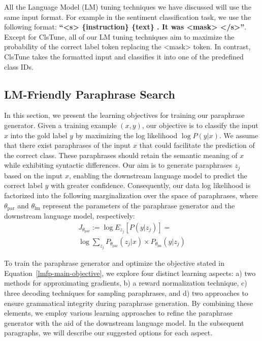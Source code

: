 \documentclass[11pt]{article}
\begin{document}
All the Language Model (LM) tuning techniques we have discussed will use the same input format. For example in the sentiment classification task, we use the following format:
\textbf{``<s> \{instruction\} \{text\} . It was <mask> </s>''}. Except for ClsTune, all of our LM tuning techniques aim to maximize the probability of the correct label token replacing the <mask> token. In contrast, ClsTune takes the formatted input and classifies it into one of the predefined class IDs.
\subsection{LM-Friendly Paraphrase Search}
In this section, we present the learning objectives for training our paraphrase generator. Given a training example $(x, y)$, our objective is to classify the input $x$ into the gold label $y$ by maximizing the log likelihood $\log P(y|x)$. We assume that there exist paraphrases of the input $x$ that could facilitate the prediction of the correct class. These paraphrases should retain the semantic meaning of $x$ while exhibiting syntactic differences. Our aim is to generate paraphrases $z_{j}$ based on the input $x$, enabling the downstream language model to predict the correct label $y$ with greater confidence. Consequently, our data log likelihood is factorized into the following marginalization over the space of paraphrases, where $\theta_{\text{par}}$ and $\theta_{\text{lm}}$ represent the parameters of the paraphrase generator and the downstream language model, respectively:
\begin{multline}
J_{\theta_{\text{par}}} := \log E_{z_{j}} [P(y | z_{j})] = \\ \log \sum_{z_{j}} P_{\theta_{\text{par}}}(z_{j} | x) \times P_{\theta_{\text{lm}}}(y | z_{j})
\label{lmfp-main-objective}
\end{multline}


To train the paraphrase generator and optimize the objective stated in Equation~\ref{lmfp-main-objective}, we explore four distinct learning aspects: a) two methods for approximating gradients, b) a reward normalization technique, c) three decoding techniques for sampling paraphrases, and d) two approaches to ensure grammatical integrity during paraphrase generation. By combining these elements, we employ various learning approaches to refine the paraphrase generator with the aid of the downstream language model. In the subsequent paragraphs, we will describe our suggested options for each aspect.
\end{document}
